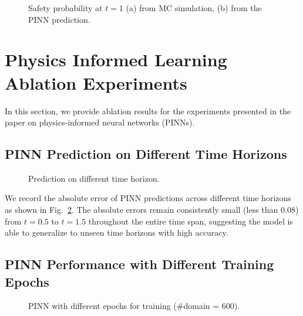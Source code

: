\documentclass[letterpaper]{article} %
\begin{document}
\begin{figure}[t]
  \begin{subfigure}{0.45\columnwidth}
  
  \caption{}
  \end{subfigure}
  \hspace{3pt}
  \begin{subfigure}{0.45\columnwidth}
  
  \caption{} 
  \end{subfigure} 
    \caption{Safety probability at $t = 1$ (a) from MC simulation, (b) from the PINN prediction.
    }
    \label{fig:safe_prob_3d->2d}
\end{figure}





\section{Physics Informed Learning Ablation Experiments}

In this section, we provide ablation results for the experiments presented in the paper on physics-informed neural networks (PINNs). 

\subsection{PINN Prediction on Different Time Horizons}

\begin{figure}[ht]
    \centering
    
    \caption{Prediction on different time horizon.}
    \label{fig:prediction_time}
\end{figure}

We record the absolute error of PINN predictions across different time horizons as shown in Fig.~\ref{fig:prediction_time}. The absolute errors remain consistently small (less than 0.08) from $t = 0.5$ to $t = 1.5$ throughout the entire time span, suggesting the model is able to generalize to unseen time horizons with high accuracy. 

\subsection{PINN Performance with Different Training Epochs}

\begin{figure}[ht]
    \centering
    
    \caption{PINN with different epochs for training (\#domain = 600).}
    \label{fig:pinn_epoch}
\end{figure}

\end{document}
